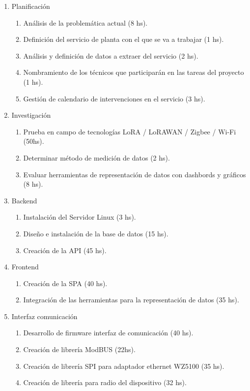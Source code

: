 \documentclass[
11pt, %
]{charter}
\begin{document}
\begin{enumerate}
\item Planificación
	\begin{enumerate}
	\item Análisis de la problemática actual (8 hs).
	\item Definición del servicio de planta con el que se va a trabajar (1 hs).
	\item Análisis y definición de datos a extraer del servicio (2 hs).
	\item Nombramiento de los técnicos que participarán en las tareas del proyecto (1 hs).
	\item Gestión de calendario de intervenciones en el servicio (3 hs).
	\end{enumerate}
\item Investigación
	\begin{enumerate}
	\item Prueba en campo de tecnologías LoRA / LoRAWAN / Zigbee / Wi-Fi (50hs).
	\item Determinar método de medición de datos (2 hs).
	\item Evaluar herramientas de representación de datos con dashbords y gráficos (8 hs).
	\end{enumerate}
\item Backend
	\begin{enumerate}
	\item Instalación del Servidor Linux (3 hs).
	\item Diseño e instalación de la base de datos (15 hs).
	\item Creación de la API (45 hs).
	\end{enumerate}
\item Frontend
	\begin{enumerate}
	\item Creación de la SPA (40 hs).
	\item Integración de las herramientas para la representación de datos (35 hs).
	\end{enumerate}
\item Interfaz comunicación 
	\begin{enumerate}
	\item Desarrollo de firmware interfaz de comunicación (40 hs).
	\item Creación de librería ModBUS (22hs).
	\item Creación de librería SPI para adaptador ethernet WZ5100 (35 hs).
	\item Creación de librería para radio del dispositivo (32 hs).

\end{enumerate}
\end{enumerate}
\end{document}
